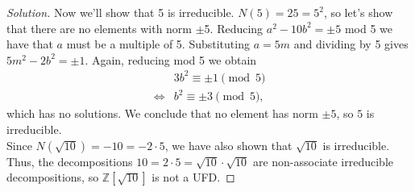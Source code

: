 \documentclass[11pt,letterpaper]{report}
\newcommand{\integers}{\mathbb{Z}}
\newenvironment{solution}
{\begin{proof}[Solution]}
{\end{proof}}
\begin{document}
\begin{enumerate}
\begin{enumerate}
\begin{solution}
			\noindent Now we'll show that 5 is irreducible. $N(5) = 25 = 5^2$, so let's show that there are no elements with norm $\pm$5. Reducing $a^2-10b^2=\pm 5$ mod 5 we have that $a$ must be a multiple of 5. Substituting $a=5m$ and dividing by 5 gives $5m^2-2b^2 = \pm 1$. Again, reducing mod 5 we obtain
			\begin{align*}
				&3b^2 \equiv \pm 1\pmod{5}\\
				\iff&b^2 \equiv \pm 3\pmod{5},
			\end{align*}
			which has no solutions. We conclude that no element has norm $\pm 5$, so $5$ is irreducible.\\

			\noindent Since $N(\sqrt{10}) = -10 = -2\cdot 5$, we have also shown that $\sqrt{10}$ is irreducible. Thus, the decompositions $10 = 2\cdot 5 = \sqrt{10}\cdot \sqrt{10}$ are non-associate irreducible decompositions, so $\integers[\sqrt{10}]$ is not a UFD.
		\end{solution}
	\end{enumerate}
\end{enumerate}
\end{document}
